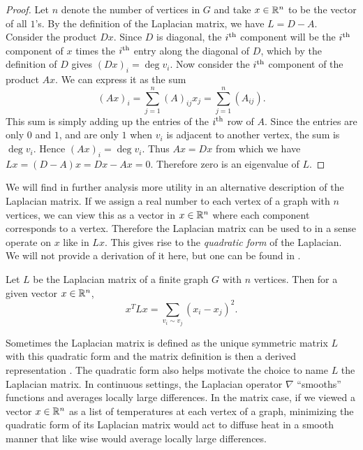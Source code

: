 \documentclass[11pt]{article}
\begin{document}
\begin{proof}
    Let $n$ denote the number of vertices in $G$ and take $x \in \mathbb{R}^n$ to be the vector of all $1$'s. By the definition of the Laplacian matrix, we have $L = D - A$. Consider the product $D x$. Since $D$ is diagonal, the $i^{\text{th}}$ component will be the $i^{\text{th}}$ component of $x$ times the $i^{\text{th}}$ entry along the diagonal of $D$, which by the definition of $D$ gives $(Dx)_i = \deg v_i$. Now consider the $i^{\text{th}}$ component of the product $Ax$. We can express it as the sum
    \[
        (Ax)_i = \sum_{j=1}^n (A)_{ij} x_j = \sum_{j=1}^n (A_{ij})
    .\]
    This sum is simply adding up the entries of the $i^{\text{th}}$ row of $A$. Since the entries are only $0$ and $1$, and are only $1$ when $v_i$ is adjacent to another vertex, the sum is $\deg v_i$. Hence $(Ax)_i = \deg v_i$. Thus $Ax = Dx$ from which we have $Lx = (D - A)x = Dx - Ax = 0$. Therefore zero is an eigenvalue of $L$.
\end{proof}

We will find in further analysis more utility in an alternative description of the Laplacian matrix. If we assign a real number to each vertex of a graph with $n$ vertices, we can view this as a vector in $x \in \mathbb{R}^n$ where each component corresponds to a vertex. Therefore the Laplacian matrix can be used to in a sense operate on $x$ like in $Lx$. This gives rise to the \emph{quadratic form} of the Laplacian. We will not provide a derivation of it here, but one can be found in \cite{mohar2004graph}.

\begin{theorem}
    Let $L$ be the Laplacian matrix of a finite graph $G$ with $n$ vertices. Then for a given vector $x \in \mathbb{R}^n$,
    \[
        x^T L x = \sum_{v_i \sim v_j} (x_i - x_j)^2.
    \]
\end{theorem}

\begin{remark}
    Sometimes the Laplacian matrix is defined as the unique symmetric matrix $L$ with this quadratic form and the matrix definition is then a derived representation \cite{WATKINS199443}. The quadratic form also helps motivate the choice to name $L$ the Laplacian matrix. In continuous settings, the Laplacian operator $\nabla$ ``smooths'' functions and averages locally large differences. In the matrix case, if we viewed a vector $x \in \mathbb{R}^n$ as a list of temperatures at each vertex of a graph, minimizing the quadratic form of its Laplacian matrix would act to diffuse heat in a smooth manner that like wise would average locally large differences.
\end{remark}
\end{document}
